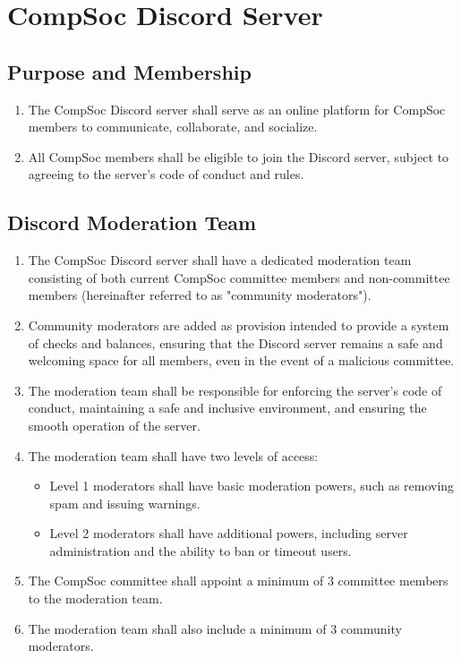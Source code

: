 

\section{CompSoc Discord Server}
\subsection{Purpose and Membership}
\begin{enumerate}
    \item The CompSoc Discord server shall serve as an online platform for CompSoc members to communicate, collaborate, and socialize.
    \item All CompSoc members shall be eligible to join the Discord server, subject to agreeing to the server's code of conduct and rules.
\end{enumerate}

\subsection{Discord Moderation Team}
\begin{enumerate}
    \item The CompSoc Discord server shall have a dedicated moderation team consisting of both current CompSoc committee members and non-committee members (hereinafter referred to as "community moderators").
    \item Community moderators are added as provision intended to provide a system of checks and balances, ensuring that the Discord server remains a safe and welcoming space for all members, even in the event of a malicious committee.
    \item The moderation team shall be responsible for enforcing the server's code of conduct, maintaining a safe and inclusive environment, and ensuring the smooth operation of the server.
    \item The moderation team shall have two levels of access:
    \begin{itemize}
        \item Level 1 moderators shall have basic moderation powers, such as removing spam and issuing warnings.
        \item Level 2 moderators shall have additional powers, including server administration and the ability to ban or timeout users.
    \end{itemize}
    \item The CompSoc committee shall appoint a minimum of 3 committee members to the moderation team.
    \item The moderation team shall also include a minimum of 3 community moderators. 
\end{enumerate}

